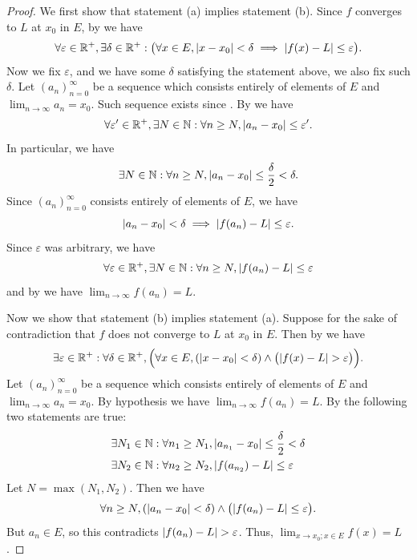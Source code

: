 \begin{proof}
  We first show that statement (a) implies statement (b).
  Since \(f\) converges to \(L\) at \(x_0\) in \(E\), by  we have
  \[
    \forall \varepsilon \in \mathbb{R}^+, \exists \delta \in \mathbb{R}^+ : \big(\forall x \in E, \left\lvert x - x_0\right\rvert < \delta \implies \left\lvert f(x) - L\right\rvert \leq \varepsilon\big).
  \]
  Now we fix \(\varepsilon\), and we have some \(\delta\) satisfying the statement above, we also fix such \(\delta\).
  Let \((a_n)_{n = 0}^\infty\) be a sequence which consists entirely of elements of \(E\) and \(\lim_{n \to \infty} a_n = x_0\).
  Such sequence exists since .
  By  we have
  \[
    \forall \varepsilon' \in \mathbb{R}^+, \exists N \in \mathbb{N} : \forall n \geq N, \left\lvert a_n - x_0\right\rvert \leq \varepsilon'.
  \]
  In particular, we have
  \[
    \exists N \in \mathbb{N} : \forall n \geq N, \left\lvert a_n - x_0\right\rvert \leq \dfrac{\delta}{2} < \delta.
  \]
  Since \((a_n)_{n = 0}^\infty\) consists entirely of elements of \(E\), we have
  \[
    \left\lvert a_n - x_0\right\rvert < \delta \implies \left\lvert f(a_n) - L\right\rvert \leq \varepsilon.
  \]
  Since \(\varepsilon\) was arbitrary, we have
  \[
    \forall \varepsilon \in \mathbb{R}^+, \exists N \in \mathbb{N} : \forall n \geq N, \left\lvert f(a_n) - L\right\rvert \leq \varepsilon
  \]
  and by  we have \(\lim_{n \to \infty} f(a_n) = L\).

  Now we show that statement (b) implies statement (a).
  Suppose for the sake of contradiction that \(f\) does not converge to \(L\) at \(x_0\) in \(E\).
  Then by  we have
  \[
    \exists \varepsilon \in \R^+ : \forall \delta \in \R^+, \Big(\forall x \in E, (\abs{x - x_0} < \delta) \land \big(\abs{f(x) - L} > \varepsilon\big)\Big).
  \]
  Let \((a_n)_{n = 0}^\infty\) be a sequence which consists entirely of elements of \(E\) and \(\lim_{n \to \infty} a_n = x_0\).
  By hypothesis we have \(\lim_{n \to \infty} f(a_n) = L\).
  By  the following two statements are true:
  \begin{align*}
     & \exists N_1 \in \mathbb{N} : \forall n_1 \geq N_1, \left\lvert a_{n_1} - x_0\right\rvert \leq \dfrac{\delta}{2} < \delta \\
     & \exists N_2 \in \mathbb{N} : \forall n_2 \geq N_2, \left\lvert f(a_{n_2}) - L\right\rvert \leq \varepsilon
  \end{align*}
  Let \(N = \max(N_1, N_2)\).
  Then we have
  \[
    \forall n \geq N, (\abs{a_n - x_0} < \delta) \land \big(\abs{f(a_n) - L} \leq \varepsilon\big).
  \]
  But \(a_n \in E\), so this contradicts \(\left\lvert f(a_n) - L\right\rvert > \varepsilon\).
  Thus, \(\lim_{x \to x_0 ; x \in E} f(x) = L\).
\end{proof}


